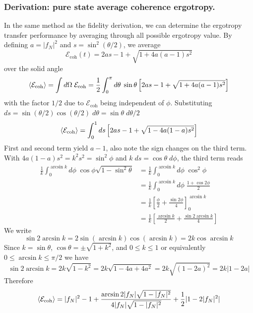 \documentclass[../../../main.tex]{subfiles}
\begin{document}
\subsubsection{Derivation: pure state average coherence ergotropy.}
In the same method as the fidelity derivation, we can determine the ergotropy transfer performance by averaging through all possible ergotropy value.
By defining $a = |f_N|^2$ and $s = \sin ^2 (\theta/2)$, we average
\begin{equation*}
  \mathcal{E}_\text{coh} (t) = 2as-1+\sqrt{1+4a(a-1)s^2}
\end{equation*}
over the solid angle
\begin{equation*}
  \braket{\mathcal{E}_\text{coh}} = \int d\Omega\; \mathcal{E}_\text{coh} = \frac{1 }{2 }\int_{0}^{\pi} d\theta\;\sin\theta \left[  2as-1+\sqrt{1+4a(a-1)s^2} \right]
\end{equation*}
with the factor $1/2$ due to $\mathcal{E}_\text{coh}$ being independent of $\phi$.
Substituting $ds = \sin (\theta/2)\cos (\theta/2)\;d\theta = \sin \theta\;d\theta/2$
\begin{equation*}
  \braket{\mathcal{E}_\text{coh}} = \int_{0}^{1} ds \left[  2as-1+\sqrt{1-4a(1-a)s^2} \right]
\end{equation*}
First and second term yield $a-1$, also note the sign changes on the third term.
With $4a(1-a)s^2=k^2s^2=\sin ^2\phi$ and $k\;ds=\cos\theta\;d\phi$, the third term reads
\begin{align*}
  \frac{1}{k }\int_{0}^{\arcsin k }d\phi\;\cos \phi \sqrt{1-\sin ^2\theta}
   & =
  \frac{1}{k }\int_{0}^{\arcsin k }d\phi\;\cos^2 \phi                                   \\
   & = \frac{1}{k }\int_{0}^{\arcsin k }d\phi\;\frac{1+\cos 2\phi}{2}                   \\
   & = \frac{1 }{k }\left[ \frac{\phi}{2}+ \frac{\sin 2\phi}{4} \right] _0^{\arcsin k } \\
   & = \frac{1 }{k }\left[ \frac{\arcsin k}{2}+ \frac{\sin 2\arcsin k}{4} \right]
\end{align*}
We write
\begin{equation*}
  \sin 2\arcsin k = 2 \sin(\arcsin k) \cos (\arcsin k) = 2k \cos \arcsin k
\end{equation*}
Since $k= \sin \theta$, $\cos \theta = \pm\sqrt{1+k^2}$, and $0\leq k\leq 1$ or equivalently $0\leq \arcsin k\leq \pi/2$ we have
\begin{equation*}
  \sin 2\arcsin k = 2k \sqrt{1-k^2} = 2k \sqrt{1-4a+4a^2} = 2k \sqrt{(1-2a)^2} = 2k|1-2a|
\end{equation*}
Therefore
\begin{equation*}
  \braket{\mathcal{E}_\text{coh}} = |f_N|^2-1 + \frac{\arcsin 2|f_N|\sqrt{1-|f_N|^2 }}{4|f_N|\sqrt{1-|f_N|^2}} + \frac{1 }{2} |1-2|f_N|^2 |
\end{equation*}
\end{document}
